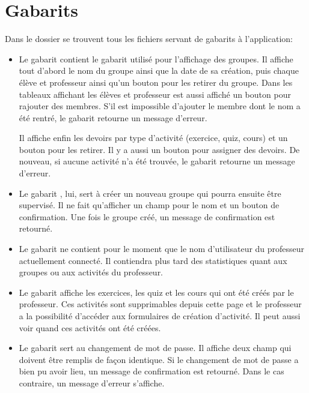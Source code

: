 \documentclass[a4paper,10pt,french]{sphinxmanual}
\begin{document}
\section{Gabarits}
\label{documentation:gabarits}
Dans le dossier  se trouvent tous les fichiers  servant
de gabarits à l'application:
\begin{itemize}
\item {} 
Le gabarit  contient le gabarit utilisé pour l'affichage
des groupes. Il affiche tout d'abord le nom du groupe ainsi que la date de
sa création, puis chaque élève et professeur ainsi qu'un bouton pour
les retirer du groupe. Dans les tableaux affichant les élèves et professeur
est aussi affiché un bouton pour rajouter des membres. S'il est impossible
d'ajouter le membre dont le nom a été rentré, le gabarit retourne un
message d'erreur.

Il affiche enfin les devoirs par type d'activité (exercice, quiz, cours) et
un bouton pour les retirer. Il y a aussi un bouton pour assigner des
devoirs. De nouveau, si aucune activité n'a été trouvée, le gabarit
retourne un message d'erreur.

\item {} 
Le gabarit , lui, sert à créer un nouveau groupe qui pourra
ensuite être supervisé. Il ne fait qu'afficher un champ pour le nom et un
bouton de confirmation. Une fois le groupe créé, un message de confirmation
est retourné.

\item {} 
Le gabarit  ne contient pour le moment que le nom
d'utilisateur du professeur actuellement connecté. Il contiendra plus tard
des statistiques quant aux groupes ou aux activités du professeur.

\item {} 
Le gabarit  affiche les exercices, les quiz et les cours
qui ont été créés par le professeur. Ces activités sont supprimables depuis
cette page et le professeur a la possibilité d'accéder aux formulaires de
création d'activité. Il peut aussi voir quand ces activités ont été créées.

\item {} 
Le gabarit  sert au changement de mot de passe. Il affiche
deux champ qui doivent être remplis de façon identique. Si le changement
de mot de passe a bien pu avoir lieu, un message de confirmation est
retourné. Dans le cas contraire, un message d'erreur s'affiche.

\end{itemize}
\end{document}
